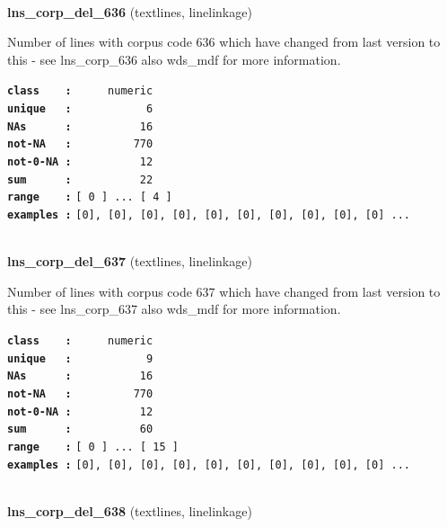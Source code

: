 \documentclass[]{article}
\begin{document}
~

\textbf{lns\_corp\_del\_636} (textlines, linelinkage)

Number of lines with corpus code 636 which have changed from last
version to this - see lns\_corp\_636 also wds\_mdf for more information.

\textbf{\texttt{class\ \ \ \ :}} \texttt{~~~~~numeric}\\
\textbf{\texttt{unique\ \ \ :}} \texttt{~~~~~~~~~~~6}\\
\textbf{\texttt{NAs\ \ \ \ \ \ :}} \texttt{~~~~~~~~~~16}\\
\textbf{\texttt{not-NA\ \ \ :}} \texttt{~~~~~~~~~770}\\
\textbf{\texttt{not-0-NA\ :}} \texttt{~~~~~~~~~~12}\\
\textbf{\texttt{sum\ \ \ \ \ \ :}} \texttt{~~~~~~~~~~22}\\
\textbf{\texttt{range\ \ \ \ :}}
\texttt{{[}\ 0\ {]}\ ...\ {[}\ 4\ {]}}\\
\textbf{\texttt{examples\ :}}
\texttt{{[}0{]},\ {[}0{]},\ {[}0{]},\ {[}0{]},\ {[}0{]},\ {[}0{]},\ {[}0{]},\ {[}0{]},\ {[}0{]},\ {[}0{]}\ ...}\\

~

\textbf{lns\_corp\_del\_637} (textlines, linelinkage)

Number of lines with corpus code 637 which have changed from last
version to this - see lns\_corp\_637 also wds\_mdf for more information.

\textbf{\texttt{class\ \ \ \ :}} \texttt{~~~~~numeric}\\
\textbf{\texttt{unique\ \ \ :}} \texttt{~~~~~~~~~~~9}\\
\textbf{\texttt{NAs\ \ \ \ \ \ :}} \texttt{~~~~~~~~~~16}\\
\textbf{\texttt{not-NA\ \ \ :}} \texttt{~~~~~~~~~770}\\
\textbf{\texttt{not-0-NA\ :}} \texttt{~~~~~~~~~~12}\\
\textbf{\texttt{sum\ \ \ \ \ \ :}} \texttt{~~~~~~~~~~60}\\
\textbf{\texttt{range\ \ \ \ :}}
\texttt{{[}\ 0\ {]}\ ...\ {[}\ 15\ {]}}\\
\textbf{\texttt{examples\ :}}
\texttt{{[}0{]},\ {[}0{]},\ {[}0{]},\ {[}0{]},\ {[}0{]},\ {[}0{]},\ {[}0{]},\ {[}0{]},\ {[}0{]},\ {[}0{]}\ ...}\\

~

\textbf{lns\_corp\_del\_638} (textlines, linelinkage)
\end{document}
